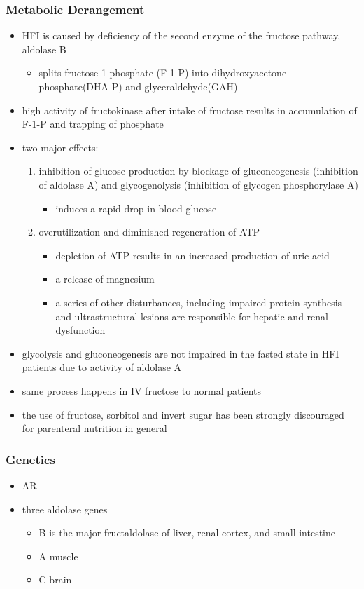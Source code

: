 \documentclass{scrartcl}
\begin{document}
\subsubsection{Metabolic Derangement}
\label{sec:org5e0b2be}
\begin{itemize}
\item HFI is caused by deficiency of the second enzyme of the fructose
pathway, aldolase B
\begin{itemize}
\item splits fructose-1-phosphate (F-1-P) into dihydroxyacetone phosphate(DHA-P) and glyceraldehyde(GAH)
\end{itemize}
\item high activity of fructokinase after intake of fructose results in
accumulation of F-1-P and trapping of phosphate
\item two major effects:
\begin{enumerate}
\item inhibition of glucose production by blockage of gluconeogenesis
(inhibition of aldolase A) and glycogenolysis (inhibition of glycogen phosphorylase A)
\begin{itemize}
\item induces a rapid drop in blood glucose
\end{itemize}
\item overutilization and diminished regeneration of ATP
\begin{itemize}
\item depletion of ATP results in an increased production of uric acid
\item a release of magnesium
\item a series of other disturbances, including impaired protein
synthesis and ultrastructural lesions are responsible for
hepatic and renal dysfunction
\end{itemize}
\end{enumerate}
\item glycolysis and gluconeogenesis are not impaired in the fasted state in HFI patients due to activity of aldolase A
\item same process happens in IV fructose to normal patients
\item the use of fructose, sorbitol and invert sugar has been strongly discouraged for parenteral nutrition in general
\end{itemize}

\subsubsection{Genetics}
\label{sec:org4398bf0}
\begin{itemize}
\item AR
\item three aldolase genes
\begin{itemize}
\item B is the major fructaldolase of liver, renal cortex, and small intestine
\item A muscle
\item C brain
\end{itemize}
\end{itemize}
\end{document}
